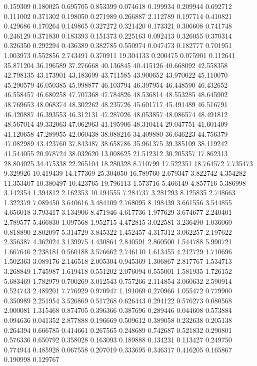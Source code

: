 0.159309
0.180025
0.695705
0.853399
0.074618
0.199934
0.209944
0.692712
0.111002
0.371302
0.198050
0.271989
0.266887
2.112789
0.197714
0.410821
0.429686
0.170264
0.149865
0.327272
0.321420
0.173321
0.306608
0.741748
0.246129
0.371830
0.183393
0.151373
0.225163
0.092413
0.326055
0.370314
0.326350
0.292294
0.436389
0.382785
0.550974
0.047473
0.182777
0.701951
1.003973
0.552856
2.743491
0.370911
19.304133
0.200475
0.075901
0.112641
35.871204
36.196589
37.276668
40.136845
40.415126
40.668092
42.558358
42.798135
43.173901
43.183699
43.711585
43.900652
43.970022
45.110070
45.290579
46.050385
45.998877
46.103794
46.397954
46.448590
46.432652
46.558457
46.680258
47.707368
47.784826
48.536814
48.553285
48.645902
48.769653
48.068374
48.302262
48.235726
45.601717
45.491489
46.516791
46.420887
46.393553
46.312131
47.287026
48.053857
48.086574
48.491812
48.567014
49.332063
47.062963
41.195906
48.310414
29.047751
41.601409
41.120658
47.289955
42.060438
38.088216
34.409880
36.646223
44.756379
47.082989
43.423760
37.843487
38.658786
35.961375
39.385109
38.119242
41.544055
20.978724
38.032620
13.008625
21.512312
30.205357
17.862313
28.804025
34.475338
22.265104
18.280328
8.710799
17.522351
18.764572
7.735473
9.329926
10.419439
14.177369
25.304050
16.789760
2.679347
3.822742
4.354282
11.353407
10.380497
10.423765
19.796113
1.573716
5.466149
4.857716
5.386998
3.142354
1.394812
2.162353
10.194555
7.284737
3.281293
8.125835
2.748663
1.322379
7.089450
3.640616
3.484109
2.768095
8.198439
3.661556
3.544855
4.656018
3.793417
3.134906
8.471946
4.617736
1.977629
3.674677
2.240401
2.789577
5.466830
1.097568
1.952715
4.472815
3.022581
3.236490
1.036060
0.818890
2.802097
5.314729
3.845322
1.452457
4.317312
3.062257
2.197622
2.356387
4.362024
3.139975
4.430864
2.840591
2.860500
1.544788
5.990721
1.667646
2.238181
0.560188
3.576662
2.746110
1.613455
4.212729
1.710696
1.502363
3.089176
2.146518
2.005304
0.945369
1.306867
2.817767
1.534713
3.268849
1.745987
1.619418
0.551202
2.076094
0.555001
1.581935
1.726152
5.683469
1.782979
0.700269
3.012543
0.757266
2.114854
3.060632
2.590914
0.524743
2.489201
7.776929
0.970947
1.191069
0.270966
1.055472
0.779900
0.350989
2.251954
3.526869
0.517268
0.626443
0.294122
0.576273
0.080568
2.000081
1.315468
0.874705
0.396366
0.387696
0.289446
0.044608
0.573884
0.094636
0.041352
2.877888
0.196669
0.509612
0.389058
0.232638
0.205138
0.264394
0.666785
0.414661
0.267565
0.248689
0.742687
0.521832
0.290801
0.576336
0.650792
0.358028
0.163093
0.189888
0.134231
0.113427
0.249750
0.774944
0.485928
0.067558
0.207019
0.333695
0.346317
0.416205
0.165867
0.190998
0.129767
